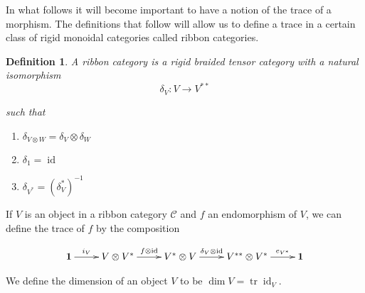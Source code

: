 \documentclass[]{article}
\newtheorem{defn}[theorem]{Definition}
\newcommand{\tr}{\operatorname{tr}}
\newcommand{\id}{\operatorname{id}}
\numberwithin{equation}{subsection}
\begin{document}
In what follows it will become important to have a notion of the trace of a
morphism. The definitions that follow will allow us to define a trace in a
certain class of rigid monoidal categories called ribbon categories.

\begin{defn}

    A \emph{ribbon category} is a rigid braided tensor category with a natural isomorphism
    \begin{equation}
        \delta_V: V \to V^{**}
    \end{equation}

such that 
\begin{enumerate}
    \renewcommand{\labelenumi}{\roman{enumi})}

    \item $\delta_{V \otimes W} = \delta_V \otimes \delta_W$
    \item $\delta_1 = \id$
    \item $\delta_{V^*} = (\delta_V^*)^{-1}$
\end{enumerate}

\end{defn}

If $V$ is an object in a ribbon category $\mathcal{C}$ and $f$ an endomorphism of $V$, we can define the trace of $f$ by the composition

\begin{equation}
    \xymatrix{
    \mathbf{1} \ar[r]^-{i_V} & V \otimes V^* \ar[r]^-{f \otimes \id} & V^* \otimes V \ar[r]^-{\delta_V \otimes \id} & V^{**} \otimes V^* \ar[r]^-{e_{V^*}} & 
    \mathbf{1}
    }
\end{equation}

We define the dimension of an object $V$ to be $\dim V = \tr \id_V$.
\end{document}
